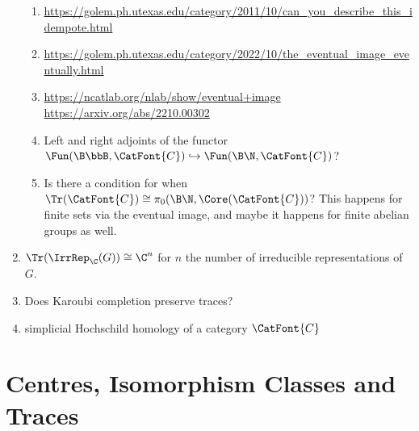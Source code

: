 \begin{enumerate}
\begin{enumerate}
            \item \url{https://golem.ph.utexas.edu/category/2011/10/can_you_describe_this_idempote.html}
            \item \url{https://golem.ph.utexas.edu/category/2022/10/the_eventual_image_eventually.html}
            \item \url{https://ncatlab.org/nlab/show/eventual+image}
                \url{https://arxiv.org/abs/2210.00302}
            \item Left and right adjoints of the functor $\Fun(\B\bbB,\CatFont{C})\hookrightarrow\Fun(\B\N,\CatFont{C})$?
            \item Is there a condition for when $\Tr(\CatFont{C})\cong\pi_{0}(\B\N,\Core(\CatFont{C}))$? This happens for finite sets via the eventual image, and maybe it happens for finite abelian groups as well.
        \end{enumerate}
    \item $\Tr(\IrrRep_{\C}(G))\cong\C^{n}$ for $n$ the number of irreducible representations of $G$.
    \item Does Karoubi completion preserve traces?
    \item simplicial Hochschild homology of a category $\CatFont{C}$
\end{enumerate}

\ChapterTableOfContents

\section{Centres, Isomorphism Classes and Traces}\label{section-centres-isomorphism-classes-and-traces}
